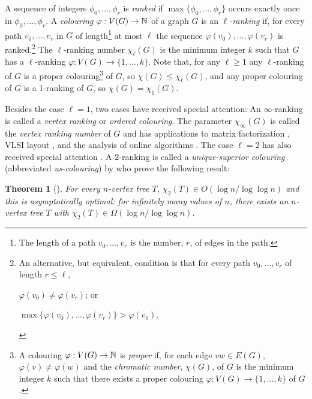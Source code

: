 \documentclass[kpfonts]{patmorin}
\newcommand{\trn}{\chi_2}
\newtheorem{othertheorem}{Theorem}
\theoremstyle{named}
\begin{document}
A sequence of integers $\phi_0,\ldots,\phi_r$ is \emph{ranked} if $\max\{\phi_0,\ldots,\phi_r\}$ occurs exactly once in $\phi_0,\ldots,\phi_r$. A \emph{colouring} $\varphi:V(G)\to \mathbb{N}$ of a graph $G$ is an \emph{$\ell$-ranking} if, for every path $v_0,\ldots,v_r$ in $G$ of length\footnote{The length of a path $v_0,\ldots,v_r$ is the number, $r$, of edges in the path.} at most $\ell$ the sequence $\varphi(v_0),\ldots,\varphi(v_r)$ is ranked.\footnote{An alternative, but equivalent, condition is that for every path $v_0,\ldots,v_r$ of length $r\le\ell$,
\begin{inparaenum}[(i)]
   \item $\varphi(v_0)\neq \varphi(v_r)$; or
   \item $\max\{\varphi(v_0),\ldots,\varphi(v_r)\} > \varphi(v_0)$.
\end{inparaenum}
}
The $\ell$-ranking number $\chi_\ell(G)$ is the minimum integer $k$ such that $G$ has a $\ell$-ranking $\varphi:V(G)\to \{1,\ldots,k\}$.  Note that, for any $\ell\ge 1$ any $\ell$-ranking of $G$ is a proper colouring\footnote{A colouring $\varphi:V(G)\to \mathbb{N}$ is \emph{proper} if, for each edge $vw\in E(G)$, $\varphi(v)\neq\varphi(w)$ and the \emph{chromatic number}, $\chi(G)$, of $G$ is the minimum integer $k$ such that there exists a proper colouring $\varphi:V(G)\to\{1,\ldots,k\}$ of $G$.} of $G$, so $\chi(G)\le \chi_\ell(G)$, and any proper colouring of $G$ is a 1-ranking of $G$, so $\chi(G)=\chi_1(G)$.

Besides the case $\ell=1$, two cases have received special attention: An $\infty$-ranking is called a \emph{vertex ranking} or \emph{ordered colouring}. The parameter $\chi_\infty(G)$ is called the \emph{vertex ranking number} of $G$ and has applications to matrix factorization \cite{bodlaender.gilbert.ea:approximating,duff.reid:multifrontal,liu:role,dereniowski.kubale:cholesky}, VLSI layout \cite{leiserson:area,sen.deng.ea:on}, and the analysis of online algorithms \cite{even.smorodinsky:hitting}. The case $\ell=2$ has also received special attention \cite{almeter.demircan.ea:graph,karpas.neiman.ea:on,shalu.antony:complexity}. A $2$-ranking is called a \emph{unique-superior colouring} (abbreviated \emph{us-colouring}) by \citet{karpas.neiman.ea:on} who prove the following result:

\setcounter{othertheorem}{19}
\begin{othertheorem}[\cite{karpas.neiman.ea:on}]\label{trees}
    For every $n$-vertex tree $T$, $\trn(T)\in O(\log n/\log\log n)$ and this is asymptotically optimal: for infinitely many values of $n$, there exists an $n$-vertex tree $T$ with $\trn(T)\in\Omega(\log n/\log\log n)$.
\end{othertheorem}
\end{document}
